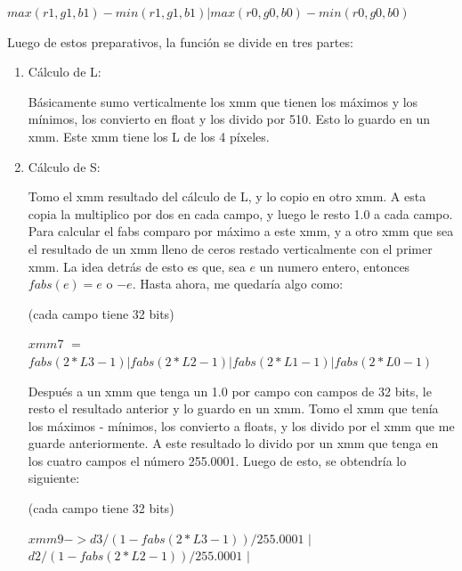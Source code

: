 \documentclass[a4paper]{article}
\begin{document}
 \hspace*{1.45cm}$max(r1,g1,b1)-min(r1,g1,b1)|max(r0,g0,b0)-min(r0,g0,b0)$

\vspace*{0.3cm}


Luego de estos preparativos, la función se divide en tres partes:

\begin{enumerate}
	\item Cálculo de L:
	
	Básicamente sumo verticalmente los xmm que tienen los máximos y los mínimos, los convierto en float y los divido por 510. Esto lo guardo en un xmm. Este xmm tiene los L de los 4 píxeles.
	
	\item Cálculo de S:	
	
Tomo el xmm resultado del cálculo de L, y lo copio en otro xmm. A esta copia la multiplico por dos en cada campo, y luego le resto 1.0 a cada campo. Para calcular el fabs comparo por máximo a este xmm, y a otro xmm que sea el resultado de un xmm lleno de ceros restado verticalmente con el primer xmm. La idea detrás de esto es que, sea $e$ un numero entero, entonces $fabs(e) = e$ o $-e$. Hasta ahora, me quedaría algo como:

\vspace*{0.3cm}

(cada campo tiene 32 bits)

\vspace*{0.3cm}
	
$xmm7$ $=$ $fabs(2*L3 - 1) |fabs(2*L2 - 1)|fabs(2*L1 - 1)| fabs( 2*L0 - 1)$	
	
\vspace*{0.3cm}

Después a un xmm que tenga un 1.0 por campo con campos de 32 bits, le resto el resultado anterior y lo guardo en un xmm. Tomo el xmm que tenía los máximos - mínimos, los convierto a floats, y los divido por el xmm que me guarde anteriormente. A este resultado lo divido por un xmm que tenga en los cuatro campos el número 255.0001. Luego de esto, se obtendría lo siguiente:  

\vspace*{0.3cm}

(cada campo tiene 32 bits)

\vspace*{0.3cm}

$xmm9 -> d3 / (1 - fabs(2*L3 - 1)) / 255.0001$ $|$ $d2 / (1 - fabs(2*L2 - 1)) / 255.0001$ $|$


\end{enumerate}
\end{document}

